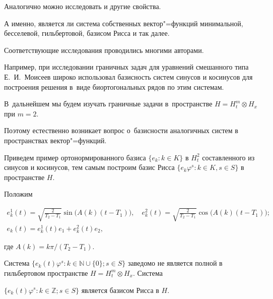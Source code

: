 \smallskip



Аналогично можно исследовать и другие свойства. 

А именно, является ли система собственных вектор"=функций минимальной, бесселевой, гильбертовой, базисом Рисса и так далее. 

Соответствующие исследования проводились многими авторами. 

Например, при исследовании граничных задач для уравнений смешанного типа Е.~И.~Моисеев \cite{kor:bib9, kor:bib10, kor:bib11} широко использовал базисность систем синусов и косинусов для построения решения в~виде биортогональных рядов по этим системам. 

В~дальнейшем мы будем изучать граничные задачи в~пространстве $H=H_t^m\otimes H_x$ при $m=2$. 

Поэтому естественно возникает вопрос о~базисности аналогичных систем в пространствах вектор"=функций. 

Приведем пример ортонормированного базиса $\{e_k:k\in K\}$ в $H_t^2$ составленного из синусов и косинусов, тем самым построим базис Рисса $\{e_k\varphi^s:k\in K,s\in S\}$ в пространстве $H$.



Положим

\begin{gather*}

e_k^1(t)=\sqrt{\frac{2}{T_2-T_1}}\sin \bigl(A(k)(t-T_1)\bigr), \quad 

e_k^2(t)=\sqrt{\frac{2}{T_2-T_1}}\cos \bigr(A(k)(t-T_1)\bigr); \\

e_k(t)=e_k^1(t)e_1+e_k^2(t)e_2, 

\end{gather*}

где  $A(k)=k{\pi}/({T_2-T_1}).$



\smallskip



\hypertarget{korn:lemma:3}{}



\begin{lemma}[3]Система $\bigl\{e_k(t)\varphi^s: k\in\mathbb{N} \cup \{0\}; s\in S\bigr\}$ заведомо не является полной в гильбертовом пространстве $H=H_t^m\otimes H_x.$ Система 

$\{e_k(t)\varphi^s: {k\in\mathbb{Z}}; s\in S\}$ является базисом Рисса в $H.$

\end{lemma}



